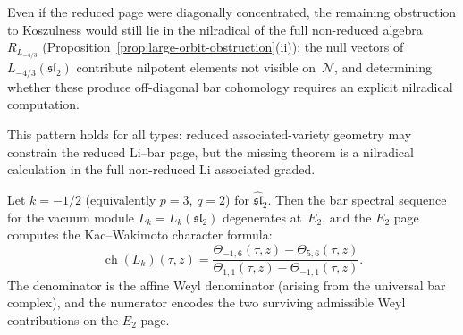 \begin{example}
Even if the reduced page were diagonally concentrated, the
remaining obstruction to Koszulness would still lie in the
nilradical of the
full non-reduced algebra $R_{L_{-4/3}}$
(Proposition~\ref{prop:large-orbit-obstruction}(ii)):
the null vectors of $L_{-4/3}(\mathfrak{sl}_2)$ contribute
nilpotent elements not visible on~$\mathcal{N}$, and
determining whether these produce off-diagonal bar
cohomology requires an explicit nilradical computation.

This pattern holds for all types: reduced associated-variety
geometry may constrain the reduced Li--bar page, but the
missing theorem is a nilradical calculation in the full non-reduced Li
associated graded.
\end{example}

\begin{theorem}[Kac--Wakimoto formula at \texorpdfstring{$k=-1/2$}{k=-1/2} via bar spectral sequence; \ClaimStatusConditional]
\label{thm:kw-bar-spectral}
Let $k=-1/2$ \textup{(}equivalently $p=3$, $q=2$\textup{)} for
$\widehat{\mathfrak{sl}}_2$. Then the
bar spectral sequence for the vacuum module
$L_k = L_k(\mathfrak{sl}_2)$ degenerates at~$E_2$, and the
$E_2$ page computes the Kac--Wakimoto character formula:
\begin{equation}\label{eq:kw-bar-derivation}
\operatorname{ch}(L_k)(\tau,z)
= \frac{\Theta_{-1,6}(\tau,z)-\Theta_{5,6}(\tau,z)}
 {\Theta_{1,1}(\tau,z) - \Theta_{-1,1}(\tau,z)}.
\end{equation}
The denominator is the affine Weyl denominator
\textup{(}arising from the universal bar complex\textup{)}, and the
numerator encodes the two surviving admissible Weyl contributions on
the $E_2$ page.
\end{theorem}

